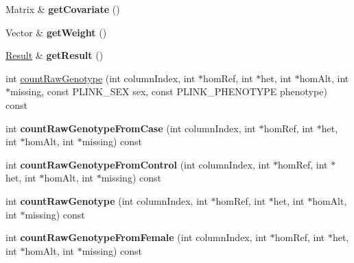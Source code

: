\begin{DoxyCompactItemize}
\item 
\hypertarget{classDataConsolidator_a96c4b5b2a122e420f86714c3cb0fa451}{Matrix \& {\bfseries get\-Covariate} ()}\label{classDataConsolidator_a96c4b5b2a122e420f86714c3cb0fa451}

\item 
\hypertarget{classDataConsolidator_ab12753ca733a0bb5d15299a7e617f98e}{Vector \& {\bfseries get\-Weight} ()}\label{classDataConsolidator_ab12753ca733a0bb5d15299a7e617f98e}

\item 
\hypertarget{classDataConsolidator_a1c576cec1c21356bf5b8efb92edc610b}{\hyperlink{classResult}{Result} \& {\bfseries get\-Result} ()}\label{classDataConsolidator_a1c576cec1c21356bf5b8efb92edc610b}

\item 
int \hyperlink{classDataConsolidator_a9438e5e1cef935dc0218b6f3a224054f}{count\-Raw\-Genotype} (int column\-Index, int $\ast$hom\-Ref, int $\ast$het, int $\ast$hom\-Alt, int $\ast$missing, const P\-L\-I\-N\-K\-\_\-\-S\-E\-X sex, const P\-L\-I\-N\-K\-\_\-\-P\-H\-E\-N\-O\-T\-Y\-P\-E phenotype) const 
\item 
\hypertarget{classDataConsolidator_ade6bb3acbcf12e6cdce387c11d2665e8}{int {\bfseries count\-Raw\-Genotype\-From\-Case} (int column\-Index, int $\ast$hom\-Ref, int $\ast$het, int $\ast$hom\-Alt, int $\ast$missing) const }\label{classDataConsolidator_ade6bb3acbcf12e6cdce387c11d2665e8}

\item 
\hypertarget{classDataConsolidator_a8284e55581f7f3f9297c860732e59e00}{int {\bfseries count\-Raw\-Genotype\-From\-Control} (int column\-Index, int $\ast$hom\-Ref, int $\ast$het, int $\ast$hom\-Alt, int $\ast$missing) const }\label{classDataConsolidator_a8284e55581f7f3f9297c860732e59e00}

\item 
\hypertarget{classDataConsolidator_a8cebd4da6d55fd703b2f4b1197b494fe}{int {\bfseries count\-Raw\-Genotype} (int column\-Index, int $\ast$hom\-Ref, int $\ast$het, int $\ast$hom\-Alt, int $\ast$missing) const }\label{classDataConsolidator_a8cebd4da6d55fd703b2f4b1197b494fe}

\item 
\hypertarget{classDataConsolidator_a71dbabe3cc64f40ce1d1ee0c3d2a1ef1}{int {\bfseries count\-Raw\-Genotype\-From\-Female} (int column\-Index, int $\ast$hom\-Ref, int $\ast$het, int $\ast$hom\-Alt, int $\ast$missing) const }\label{classDataConsolidator_a71dbabe3cc64f40ce1d1ee0c3d2a1ef1}


\end{DoxyCompactItemize}
